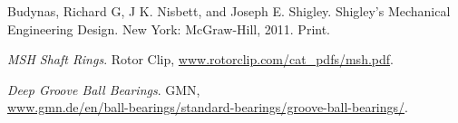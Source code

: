 \documentclass[letterpaper,12pt]{article}
\begin{document}
\begin{thebibliography}{9}
Budynas, Richard G, J K. Nisbett, and Joseph E. Shigley. Shigley's Mechanical Engineering Design. New York: McGraw-Hill, 2011. Print. 

\textit{MSH Shaft Rings}. Rotor Clip, \url{www.rotorclip.com/cat_pdfs/msh.pdf}.

\textit{Deep Groove Ball Bearings}. GMN,\\ \url{www.gmn.de/en/ball-bearings/standard-bearings/groove-ball-bearings/}.
\end{thebibliography}
\end{document}
